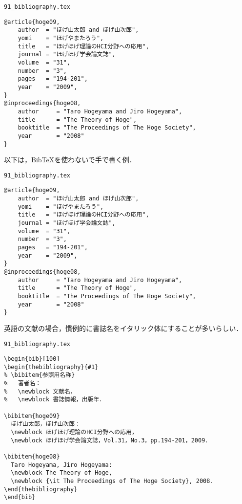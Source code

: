 \begin{itembox}[l]{{\tt 91\_bibliography.tex}}
\begin{verbatim}
@article{hoge09,
    author  = "ほげ山太郎 and ほげ山次郎",
    yomi    = "ほげやまたろう",
    title   = "ほげほげ理論のHCI分野への応用",
    journal = "ほげほげ学会論文誌",
    volume  = "31",
    number  = "3",
    pages   = "194-201",
    year    = "2009",
}
@inproceedings{hoge08,
    author     = "Taro Hogeyama and Jiro Hogeyama",
    title      = "The Theory of Hoge",
    booktitle  = "The Proceedings of The Hoge Society",
    year       = "2008"
}
\end{verbatim}
\end{itembox}


以下は，BibTeXを使わないで手で書く例．

\begin{itembox}[l]{{\tt 91\_bibliography.tex}}
\begin{verbatim}
@article{hoge09,
    author  = "ほげ山太郎 and ほげ山次郎",
    yomi    = "ほげやまたろう",
    title   = "ほげほげ理論のHCI分野への応用",
    journal = "ほげほげ学会論文誌",
    volume  = "31",
    number  = "3",
    pages   = "194-201",
    year    = "2009",
}
@inproceedings{hoge08,
    author     = "Taro Hogeyama and Jiro Hogeyama",
    title      = "The Theory of Hoge",
    booktitle  = "The Proceedings of The Hoge Society",
    year       = "2008"
}
\end{verbatim}
\end{itembox}


英語の文献の場合，慣例的に書誌名をイタリック体にすることが多いらしい．

\begin{itembox}[l]{{\tt 91\_bibliography.tex}}
\begin{verbatim}
\begin{bib}[100]
\begin{thebibliography}{#1}
% \bibitem{参照用名称}
%   著者名： 
%   \newblock 文献名，
%   \newblock 書誌情報，出版年．

\bibitem{hoge09}
  ほげ山太郎，ほげ山次郎：
  \newblock ほげほげ理論のHCI分野への応用，
  \newblock ほげほげ学会論文誌，Vol.31，No.3，pp.194-201，2009．

\bibitem{hoge08}
  Taro Hogeyama, Jiro Hogeyama:
  \newblock The Theory of Hoge,
  \newblock {\it The Proceedings of The Hoge Society}, 2008.
\end{thebibliography}
\end{bib}
\end{verbatim}
\end{itembox}

